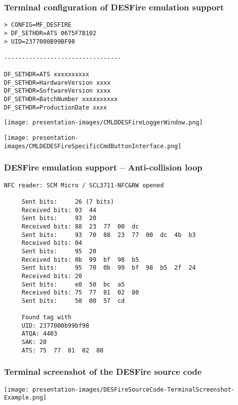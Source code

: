 \documentclass[usenames,svgnames,dvipsnames,11pt]{beamer}
\begin{document}
\begin{frame}[fragile]
\frametitle{Terminal configuration of DESFire emulation support}

\begin{Verbatim}[fontsize=\scriptsize]
> CONFIG=MF_DESFIRE
> DF_SETHDR=ATS 0675F7B102
> UID=2377000B99BF98

---------------------------------

DF_SETHDR=ATS xxxxxxxxxx
DF_SETHDR=HardwareVersion xxxx
DF_SETHDR=SoftwareVersion xxxx
DF_SETHDR=BatchNumber xxxxxxxxxx
DF_SETHDR=ProductionDate xxxx
\end{Verbatim}
\endminipage
{}
\begin{center}
\texttt{[image: presentation-images/CMLDDESFireLoggerWindow.png]}
\end{center}
\endminipage
{}
\begin{center}
\texttt{[image: presentation-images/CMLDEDESFireSpecificCmdButtonInterface.png]}
\end{center}
\endminipage

\end{frame}

\begin{frame}[fragile]
\frametitle{DESFire emulation support -- Anti-collision loop}

\begin{center}
\begin{Verbatim}[fontsize=\scriptsize]
     NFC reader: SCM Micro / SCL3711-NFC&RW opened

     Sent bits:     26 (7 bits)
     Received bits: 03  44  
     Sent bits:     93  20  
     Received bits: 88  23  77  00  dc  
     Sent bits:     93  70  88  23  77  00  dc  4b  b3  
     Received bits: 04  
     Sent bits:     95  20  
     Received bits: 0b  99  bf  98  b5  
     Sent bits:     95  70  0b  99  bf  98  b5  2f  24  
     Received bits: 20  
     Sent bits:     e0  50  bc  a5  
     Received bits: 75  77  81  02  80  
     Sent bits:     50  00  57  cd  

     Found tag with
     UID: 2377000b99bf98
     ATQA: 4403
     SAK: 20
     ATS: 75  77  81  02  80
\end{Verbatim}
\endminipage
\end{center}

\end{frame}

\begin{frame}[fragile]
\frametitle{Terminal screenshot of the DESFire source code}

\begin{center}
\texttt{[image: presentation-images/DESFireSourceCode-TerminalScreenshot-Example.png]}
\end{center}

\end{frame}
\end{document}
